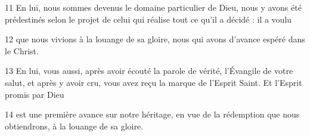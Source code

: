 
11 En lui, nous sommes devenus le domaine particulier de Dieu, nous y avons été prédestinés selon le projet de celui qui réalise tout ce qu’il a décidé : il a voulu

12 que nous vivions à la louange de sa gloire, nous qui avons d’avance espéré dans le Christ.

13 En lui, vous aussi, après avoir écouté la parole de vérité, l’Évangile de votre salut, et après y avoir cru, vous avez reçu la marque de l’Esprit Saint. Et l’Esprit promis par Dieu

14 est une première avance sur notre héritage, en vue de la rédemption que nous obtiendrons, à la louange de sa gloire.
